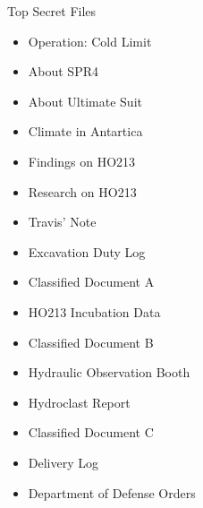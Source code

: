 \begin{secret}{Top Secret Files}
    \begin{itemize}
        \item Operation: Cold Limit
        \item About SPR4
        \item About Ultimate Suit
        \item Climate in Antartica
        \item Findings on HO213
        \item Research on HO213
        \item Travis' Note
        \item Excavation Duty Log
        \item Classified Document A
        \item HO213 Incubation Data
        \item Classified Document B
        \item Hydraulic Observation Booth
        \item Hydroclast Report
        \item Classified Document C
        \item Delivery Log
        \item Department of Defense Orders
    \end{itemize}
\end{secret}
